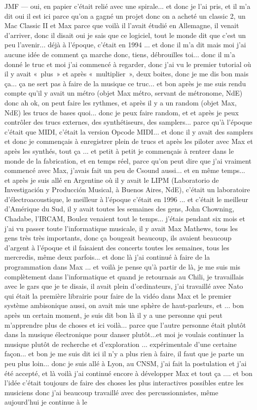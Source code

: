 JMF — oui, en papier c'était relié avec une spirale... et donc je l'ai pris, et il m'a dit oui il est ici parce qu'on a gagné un projet donc on a acheté un classic 2, un Mac Classic II et Max parce que voilà il l'avait étudié en Allemagne, il venait d'arriver, donc il disait oui je sais que ce logiciel, tout le monde dit que c'est un peu l'avenir... déjà à l'époque, c'était en 1994 ... et donc il m'a dit mais moi j'ai aucune idée de comment ça marche donc, tiens, débrouilles toi... donc il m'a donné le truc et moi j'ai commencé à regarder, donc j'ai vu le premier tutorial où il y avait « plus » et après « multiplier », deux boites, donc je me dis bon mais ça... ça ne sert pas à faire de la musique ce truc... et bon après je me suis rendu compte qu'il y avait un métro (objet Max métro, servant de métronome, NdE) donc ah ok, on peut faire les rythmes, et après il y a un random (objet Max, NdE) les trucs de bases quoi... donc je peux faire random, et et après je peux contrôler des trucs externes, des synthétiseurs, des samplers... parce qu'à l'époque c'était que MIDI, c'était la version Opcode MIDI... et donc il y avait des samplers et donc je commençais à enregistrer plein de trucs et après les piloter avec Max et après les synthés, tout ça ... et petit à petit je commençais à rentrer dans le monde de la fabrication, et en temps réel, parce qu'on peut dire que j'ai vraiment commencé avec Max, j'avais fait un peu de Csound aussi... et en même temps... et après je suis allé en Argentine où il y avait le LIPM (Laboratorio de Investigación y Producción Musical, à Buenos Aires, NdE), c'était un laboratoire d'électroacoustique, le meilleur à l'époque c'était en 1996 ... et c'était le meilleur d'Amérique du Sud, il y avait toutes les semaines des gens, John Chowning, Chadabe, l'IRCAM, Boulez venaient tout le temps... j'étais pendant six mois et j'ai vu passer toute l'informatique musicale, il y avait Max Mathews, tous les gens très très importants, donc ça bougeait beaucoup, ils avaient beaucoup d'argent à l'époque et il faisaient des concerts toutes les semaines, tous les mercredis, même deux parfois... et donc là j'ai continué à faire de la programmation dans Max ... et voilà je pense qu'à partir de là, je me suis mis complètement dans l'informatique et quand je retournais au Chili, je travaillais avec le gars que je te disais, il avait plein d'ordinateurs, j'ai travaillé avec Nato qui était la première librairie pour faire de la vidéo dans Max et le premier système ambisonique aussi, on avait mis une sphère de haut-parleurs, et ... bon après un certain moment, je suis dit bon là il y a une personne qui peut m'apprendre plus de choses et ici voilà... parce que l'autre personne était plutôt dans la musique électronique pour danser plutôt...et moi je voulais continuer la musique plutôt de recherche et d'exploration ... expérimentale d'une certaine façon... et bon je me suis dit ici il n'y a plus rien à faire, il faut que je parte un peu plus loin... donc je suis allé à Lyon, au CNSM, j'ai fait la postulation et j'ai été accepté, et là voilà j'ai continué encore à développer Max et tout ça .... et bon l'idée c'était toujours de faire des choses les plus interactives possibles entre les musiciens donc j'ai beaucoup travaillé avec des percussionnistes, même aujourd'hui je continue à le 